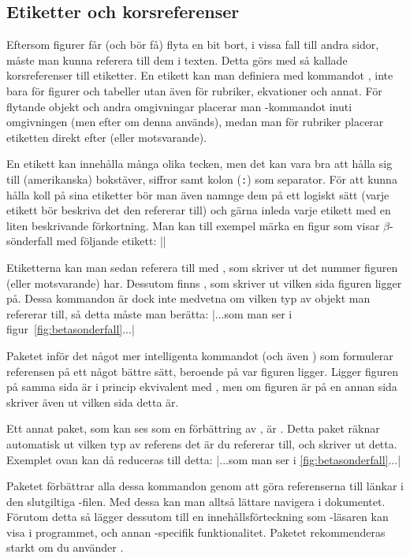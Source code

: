 \documentclass[10pt,../../a4.tex]{subfiles}
\begin{document}
\subsection{Etiketter och korsreferenser}\label{sec:labels}
Eftersom figurer får (och bör få) flyta en bit bort, i vissa fall till 
andra sidor, måste man kunna referera till dem i texten. Detta görs med så
kallade korsreferenser till etiketter. En etikett kan man definiera med
kommandot , inte bara för figurer och tabeller utan även för
rubriker, ekvationer och annat. För flytande objekt och andra omgivningar
placerar man -kommandot inuti omgivningen (men efter 
 om denna används), medan man för rubriker placerar etiketten
direkt efter  (eller motsvarande).

En etikett kan innehålla många olika tecken, men det kan vara bra att
hålla sig till (amerikanska) bokstäver, siffror samt kolon (\texttt{:}) 
som separator.
För att kunna hålla koll på sina etiketter bör man även namnge dem på ett
logiskt sätt (varje etikett bör beskriva det den refererar till) och gärna
inleda varje etikett med en liten beskrivande förkortning. Man kan till
exempel märka en figur som visar \(\beta\)-sönderfall med följande etikett:
\latex|\label{fig:betasonderfall}|

Etiketterna kan man sedan referera till med , som skriver ut det
nummer figuren (eller motsvarande) har. Dessutom finns , som
skriver ut vilken sida figuren ligger på. Dessa kommandon är dock inte
medvetna om vilken typ av objekt man refererar till, så detta måste man
berätta:
\latex|...som man ser i figur~\ref{fig:betasonderfall}...|

Paketet  inför det något mer intelligenta kommandot
 (och även ) som formulerar referensen på ett
något bättre sätt, beroende på var figuren ligger. Ligger figuren på samma
sida är  i princip ekvivalent med , men om figuren är
på en annan sida skriver  även ut vilken sida detta är.

Ett annat paket, som kan ses som en förbättring av , är
. Detta paket räknar automatisk ut vilken typ av referens
det är du refererar till, och skriver ut detta. Exemplet ovan kan då
reduceras till detta:
\latex|...som man ser i \cref{fig:betasonderfall}...|

Paketet  förbättrar alla dessa kommandon genom att
göra referenserna till länkar i den slutgiltiga \PDF-filen. Med dessa kan
man alltså lättare navigera i dokumentet. Förutom detta så lägger
 dessutom till en innehållsförteckning som \PDF-läsaren
kan visa i programmet, och annan \PDF-specifik funktionalitet. Paketet
rekommenderas starkt om du använder \pdfLaTeX.
\end{document}
